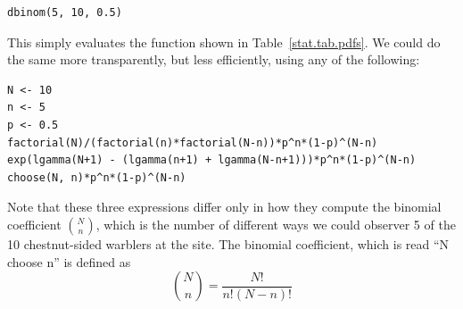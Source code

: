 \begin{verbatim}
dbinom(5, 10, 0.5)
\end{verbatim}
This simply evaluates the function shown in
Table~\ref{stat.tab.pdfs}. We could do the same more transparently, but
less efficiently, using any of the following:
\begin{verbatim}
N <- 10
n <- 5
p <- 0.5
factorial(N)/(factorial(n)*factorial(N-n))*p^n*(1-p)^(N-n)
exp(lgamma(N+1) - (lgamma(n+1) + lgamma(N-n+1)))*p^n*(1-p)^(N-n)
choose(N, n)*p^n*(1-p)^(N-n)
\end{verbatim}

Note that these three expressions differ only in how they compute the
binomial coefficient $\binom{N}{n}$, which is the number of different ways
we could observer 5 of the 10 chestnut-sided warblers at the site. The
binomial coefficient, which is read ``N choose n'' is defined as
\begin{equation}
  \label{eq:1}
  \binom{N}{n} = \frac{N!}{n!(N-n)!}
\end{equation}

